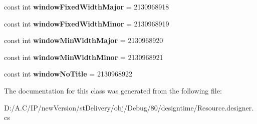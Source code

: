 \begin{DoxyCompactItemize}
\item 
\mbox{\label{classst_delivery_1_1_resource_1_1_attribute_acf289c781b6b74c0ceedb586d9d1593e}} 
const int {\bfseries window\+Fixed\+Width\+Major} = 2130968918
\item 
\mbox{\label{classst_delivery_1_1_resource_1_1_attribute_a0a4c642aae1f42ebd06829e2d4757326}} 
const int {\bfseries window\+Fixed\+Width\+Minor} = 2130968919
\item 
\mbox{\label{classst_delivery_1_1_resource_1_1_attribute_a2e23dc67e77979c79df0ee6813e2b5ab}} 
const int {\bfseries window\+Min\+Width\+Major} = 2130968920
\item 
\mbox{\label{classst_delivery_1_1_resource_1_1_attribute_a9113f63baa92eab512d7c25d3b2a75af}} 
const int {\bfseries window\+Min\+Width\+Minor} = 2130968921
\item 
\mbox{\label{classst_delivery_1_1_resource_1_1_attribute_a6c7a386a37da51a25abcccd7e2876b06}} 
const int {\bfseries window\+No\+Title} = 2130968922
\end{DoxyCompactItemize}


The documentation for this class was generated from the following file\+:\begin{DoxyCompactItemize}
\item 
D\+:/\+A.\+C/\+I\+P/new\+Version/st\+Delivery/obj/\+Debug/80/designtime/Resource.\+designer.\+cs\end{DoxyCompactItemize}
